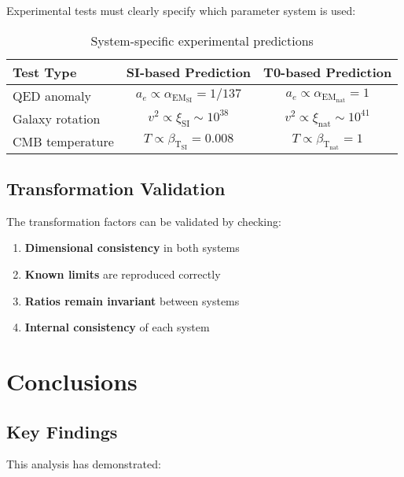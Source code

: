 \documentclass[12pt,a4paper]{article}
\newcommand{\xipar}{\xi}
\newcommand{\alphaEM}{\alpha_{\text{EM}}}
\newcommand{\betaT}{\beta_{\text{T}}}
\begin{document}
	Experimental tests must clearly specify which parameter system is used:
	
	\begin{table}[htbp]
		\centering
		\begin{tabular}{lcc}
			\toprule
			\textbf{Test Type} & \textbf{SI-based Prediction} & \textbf{T0-based Prediction} \\
			\midrule
			QED anomaly & $a_e \propto \alphaEM_{\text{SI}} = 1/137$ & $a_e \propto \alphaEM_{\text{nat}} = 1$ \\
			Galaxy rotation & $v^2 \propto \xipar_{\text{SI}} \sim 10^{38}$ & $v^2 \propto \xipar_{\text{nat}} \sim 10^{41}$ \\
			CMB temperature & $T \propto \betaT_{\text{SI}} = 0.008$ & $T \propto \betaT_{\text{nat}} = 1$ \\
			\bottomrule
		\end{tabular}
		\caption{System-specific experimental predictions}
		\label{tab:system_predictions}
	\end{table}
	
	\subsection{Transformation Validation}
	\label{subsec:transformation_validation}
	
	The transformation factors can be validated by checking:
	
	\begin{enumerate}
		\item \textbf{Dimensional consistency} in both systems
		\item \textbf{Known limits} are reproduced correctly
		\item \textbf{Ratios remain invariant} between systems
		\item \textbf{Internal consistency} of each system
	\end{enumerate}
	
	\section{Conclusions}
	\label{sec:conclusions}
	
	\subsection{Key Findings}
	\label{subsec:key_findings}
	
	This analysis has demonstrated:
	
\end{document}

